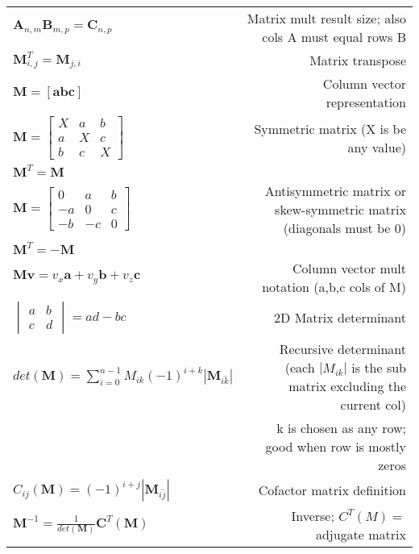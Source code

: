 \documentclass{article}
\begin{document}
{\setlength{\extrarowheight}{10pt}
 
\begin{tabulary}{8in}{LR}
$ \textbf{A}_{n,m}\textbf{B}_{m,p} = \textbf{C}_{n,p} $ & Matrix mult result size; 
also cols A must equal rows B \\

$ \textbf{M}_{i,j}^T = \textbf{M}_{j,i} $ & Matrix transpose \\

$ \textbf{M} = [\textbf{a} \textbf{b} \textbf{c}]$ & Column vector representation \\
$ \textbf{M} = \begin{bmatrix}
	X & a & b \\
	a & X & c \\
	b & c & X
	\end{bmatrix}
 $ & Symmetric matrix (X is be any value) \\
 
 $\textbf{M}^T = \textbf{M}$ & \\
 
 $ \textbf{M} = \begin{bmatrix}
	0 & a & b \\
	-a & 0 & c \\
	-b & -c & 0
	\end{bmatrix}$ &
 Antisymmetric matrix or skew-symmetric matrix 
 (diagonals must be 0) \\

$\textbf{M}^T = -\textbf{M}$ & \\ 

$ \textbf{M}\textbf{v} = v_x \textbf{a} + v_y \textbf{b} + v_z \textbf{c}$ &
Column vector mult notation (a,b,c cols of M) \\

$ \begin{vmatrix}a & b \\ c & d \end{vmatrix} = ad - bc$ & 2D Matrix determinant \\

$ det(\textbf{M}) = \sum\limits_{i=0}^{n-1} M_{ik}(-1)^{i+k}|\textbf{M}_{\bar{ik}}| $ 
& Recursive determinant (each $|M_{ik}|$ is the sub matrix excluding the current col) \\

 & k is chosen as any row; good when row is mostly zeros\\

$ C_{ij}(\textbf{M}) = (-1)^{i+j}|\textbf{M}_{\bar{ij}}|$ & Cofactor matrix definition \\
$ \textbf{M}^{-1} = \frac{1}{det(\textbf{M})} \textbf{C}^T(\textbf{M})$ 
& Inverse; $C^T(M) =$ adjugate matrix \\


\end{tabulary}}
\end{document}
